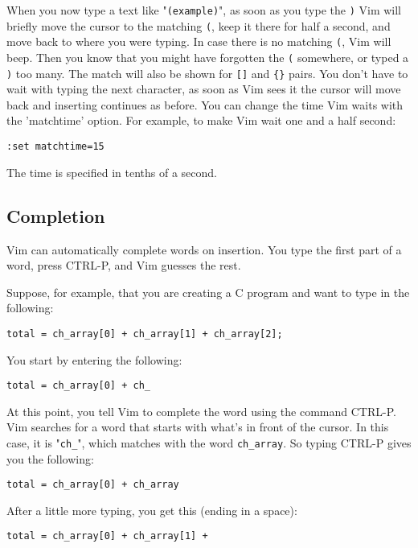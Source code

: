 When you now type a text like "\verb!(example)!", as soon as you type the \verb!)! Vim will briefly move the cursor to the matching \verb!(!, keep it there for half a second, and move back to where you were typing.
In case there is no matching \verb!(!, Vim will beep.
Then you know that you might have forgotten the \verb!(! somewhere, or typed a \verb!)! too many.
The match will also be shown for \verb![]! and \verb!{}! pairs.
You don't have to wait with typing the next character, as soon as Vim sees it the cursor will move back and inserting continues as before.
You can change the time Vim waits with the 'matchtime' option.
For example, to make Vim wait one and a half second:

\begin{Verbatim}[samepage=true]
 :set matchtime=15
\end{Verbatim}

The time is specified in tenths of a second.
\subsection{Completion}
Vim can automatically complete words on insertion.
You type the first part of a word, press CTRL-P, and Vim guesses the rest.

Suppose, for example, that you are creating a C program and want to type in the following:

\begin{Verbatim}[samepage=true]
    total = ch_array[0] + ch_array[1] + ch_array[2]; 
\end{Verbatim}

You start by entering the following:

\begin{Verbatim}[samepage=true]
    total = ch_array[0] + ch_ 
\end{Verbatim}

At this point, you tell Vim to complete the word using the command CTRL-P.
Vim searches for a word that starts with what's in front of the cursor.
In this case, it is "\verb!ch_!", which matches with the word \verb!ch_array!.
So typing CTRL-P gives you the following:

\begin{Verbatim}[samepage=true]
    total = ch_array[0] + ch_array 
\end{Verbatim}

After a little more typing, you get this (ending in a space):

\begin{Verbatim}[samepage=true]
    total = ch_array[0] + ch_array[1] +  
\end{Verbatim}

